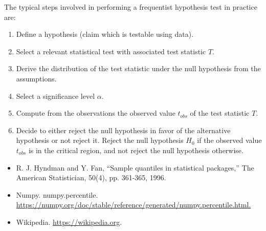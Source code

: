 \documentclass[a4paper,12pt]{report}
\begin{document}
The typical steps involved in performing a frequentist hypothesis test in practice are:
\begin{enumerate}
\item Define a hypothesis (claim which is testable using data).
\item Select a relevant statistical test with associated test statistic $T$.
\item Derive the distribution of the test statistic under the null hypothesis from the assumptions.
\item Select a significance level $\alpha$.
\item Compute from the observations the observed value $t_{obs}$ of the test statistic $T$.
\item Decide to either reject the null hypothesis in favor of the alternative hypothesis or not reject it. Reject the null hypothesis $H_0$ if the observed value $t_{obs}$ is in the critical region, and not reject the null hypothesis otherwise.
\end{enumerate}
\begin{itemize}
\item R. J. Hyndman and Y. Fan, “Sample quantiles in statistical packages,” The American Statistician, 50(4), pp. 361-365, 1996.
\item Numpy. numpy.percentile. \href{https://numpy.org/doc/stable/reference/generated/numpy.percentile.html.}{https://numpy.org/doc/stable/reference/generated/numpy.percentile.html.}
\item Wikipedia. \href{https://wikipedia.org}{https://wikipedia.org}.
\end{itemize}
\end{document}
